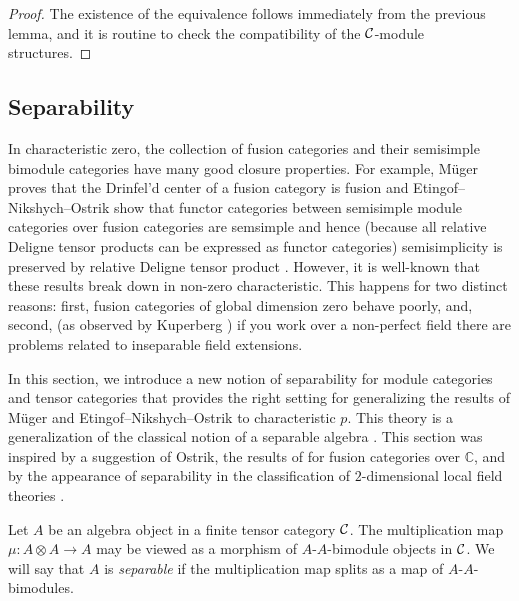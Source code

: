 \documentclass{amsart}
\begin{document}
\begin{proof}
	The existence of the equivalence follows immediately from the previous lemma, and it is routine to check the compatibility of the $\mathcal C$-module structures.  
\end{proof}



\subsection{Separability} \label{sec:tc-separable}
In characteristic zero, the collection of fusion categories and their semisimple bimodule categories have many good closure properties.  For example, M\"uger proves that the Drinfel'd center  of a fusion category is fusion \cite[Theorem 3.16]{MR1966525} and Etingof--Nikshych--Ostrik show that functor categories between semisimple module categories over fusion categories are semsimple and hence (because all relative Deligne tensor products can be expressed as functor categories) semisimplicity is preserved by relative Deligne tensor product \cite[Theorem 2.16]{MR2183279}.  However, it is well-known that these results break down in non-zero characteristic.  This happens for two distinct reasons: first, fusion categories of global dimension zero behave poorly, and, second, (as observed by Kuperberg \cite[Question 5.1]{MR1995781}) if you work over a non-perfect field there are problems related to inseparable field extensions.

In this section, we introduce a new notion of separability for module categories and tensor categories that provides the right setting for generalizing the results of M\"uger and Etingof--Nikshych--Ostrik to characteristic $p$.  This theory is a generalization of the classical notion of a separable algebra \cite{???}.   This section was inspired by a suggestion of Ostrik, the results of \cite[\S 2.4]{1009.2117} for fusion categories over $\mathbb{C}$, and by the appearance of separability in the classification of $2$-dimensional local field theories \cite{schommer-pries-thesis}.

\begin{definition}
	Let $A$ be an algebra object in a finite tensor category $\mathcal C$. The multiplication map $\mu: A \otimes A \to A$ may be viewed as a morphism of $A$-$A$-bimodule objects in $\mathcal C$. We will say that $A$ is {\em separable} if the multiplication map splits as a map of $A$-$A$-bimodules. 
\end{definition}
\end{document}
